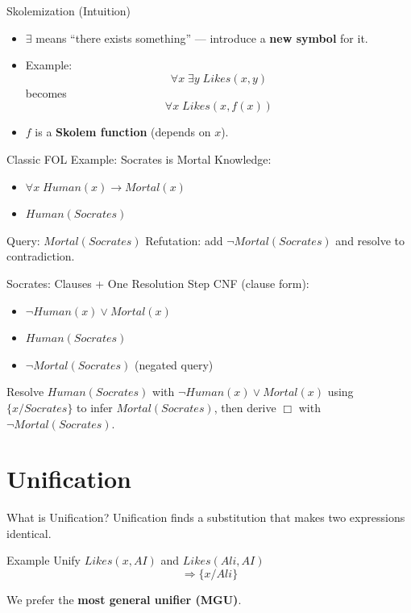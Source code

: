 \documentclass[aspectratio=169]{beamer}
\begin{document}
\begin{frame}{Skolemization (Intuition)}
  \begin{itemize}[<+->]
    \item $\exists$ means ``there exists something'' --- introduce a \textbf{new symbol} for it.
    \item Example:
    \[
      \forall x\; \exists y\; Likes(x,y)
    \]
    becomes
    \[
      \forall x\; Likes(x,f(x))
    \]
    \item $f$ is a \textbf{Skolem function} (depends on $x$).
  \end{itemize}
\end{frame}

\begin{frame}{Classic FOL Example: Socrates is Mortal}
  Knowledge:
  \begin{itemize}
    \item $\forall x\; Human(x) \rightarrow Mortal(x)$
    \item $Human(Socrates)$
  \end{itemize}
  Query: $Mortal(Socrates)$
  \vspace{0.4em}
  Refutation: add $\lnot Mortal(Socrates)$ and resolve to contradiction.
\end{frame}

\begin{frame}{Socrates: Clauses + One Resolution Step}
  CNF (clause form):
  \begin{itemize}[<+->]
    \item $\lnot Human(x) \lor Mortal(x)$
    \item $Human(Socrates)$
    \item $\lnot Mortal(Socrates)$ \hfill (negated query)
  \end{itemize}
  \vspace{0.3em}
  Resolve $Human(Socrates)$ with $\lnot Human(x) \lor Mortal(x)$ using $\{x/Socrates\}$ to infer $Mortal(Socrates)$, then derive $\Box$ with $\lnot Mortal(Socrates)$.
\end{frame}

\section{Unification}
\label{sec:unif}

\begin{frame}{What is Unification?}
  Unification finds a substitution that makes two expressions identical.
  \vspace{0.4em}
  \begin{exampleblock}{Example}
    Unify $Likes(x, AI)$ and $Likes(Ali, AI)$
    \[
      \Rightarrow \{x/Ali\}
    \]
  \end{exampleblock}
  We prefer the \textbf{most general unifier (MGU)}.
\end{frame}
\end{document}
